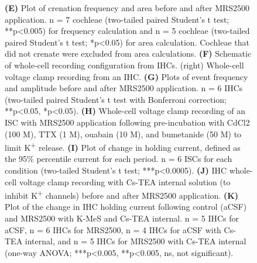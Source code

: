 \documentclass[9pt,lineno]{elife}
\begin{document}
\begin{figure} [t!]
\begin{fullwidth}
  \caption{\textbf{(E)} Plot of crenation frequency and area before and after MRS2500 application. n = 7 cochleae (two-tailed paired Student's t test; **p<0.005) for frequency calculation and n = 5 cochleae (two-tailed paired Student's t test; *p<0.05) for area calculation. Cochleae that did not crenate were excluded from area calculations.
\textbf{(F)} Schematic of whole-cell recording configuration from IHCs. (right) Whole-cell voltage clamp recording from an IHC.
\textbf{(G)} Plots of event frequency and amplitude before and after MRS2500 application. n = 6 IHCs (two-tailed paired Student's t test with Bonferroni correction; **p<0.05, *p<0.05).
\textbf{(H)} Whole-cell voltage clamp recording of an ISC with MRS2500 application following pre-incubation with CdCl2 (100 \textmu M), TTX (1 \textmu M), ouabain (10 \textmu M), and bumetanide (50 \textmu M) to limit K\textsuperscript{+} release.
\textbf{(I)} Plot of change in holding current, defined as the 95\% percentile current for each period. n = 6 ISCs for each condition (two-tailed Student’s t test; ***p<0.0005). 
\textbf{(J)} IHC whole-cell voltage clamp recording with Cs-TEA internal solution (to inhibit K\textsuperscript{+} channels) before and after MRS2500 application.
\textbf{(K)} Plot of the change in IHC holding current following control (aCSF) and MRS2500 with K-MeS and Cs-TEA internal. n = 5 IHCs for aCSF, n = 6 IHCs for MRS2500, n = 4 IHCs for aCSF with Cs-TEA internal, and n = 5 IHCs for MRS2500 with Cs-TEA internal (one-way ANOVA; ***p<0.005, **p<0.005, ns, not significant).
}
\end{fullwidth}
\end{figure}
\end{document}
